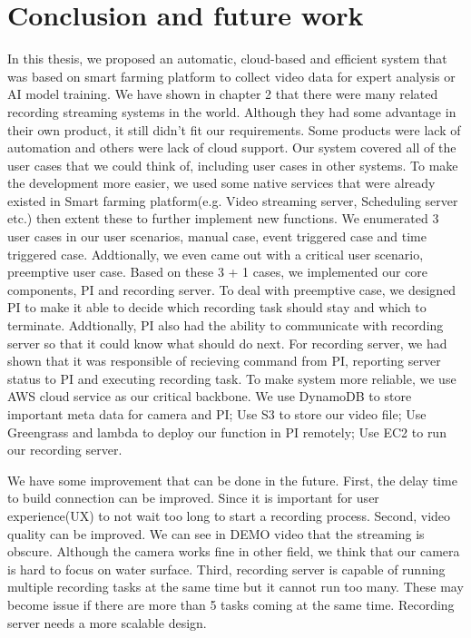 \chapter{Conclusion and future work}
\label{c:conclusion}





\graphicspath{{./figsrc/}}
\fi

In this thesis, we proposed an automatic, cloud-based and efficient system that was based on smart farming platform to collect video data for expert analysis or AI model training. We have shown in chapter 2 that there were many related recording streaming systems in the world. Although they had some advantage in their own product, it still didn't fit our requirements. Some products were lack of automation and others were lack of cloud support. Our system covered all of the user cases that we could think of, including user cases in other systems. To make the development more easier, we used some native services that were already existed in Smart farming platform(e.g. Video streaming server, Scheduling server etc.) then extent these to further implement new functions. We enumerated 3 user cases in our user scenarios, manual case, event triggered case and time triggered case. Addtionally, we even came out with a critical user scenario, preemptive user case. Based on these 3 + 1 cases, we implemented our core components, PI and recording server. To deal with preemptive case, we designed PI to make it able to decide which recording task should stay and which to terminate. Addtionally, PI also had the ability to communicate with recording server so that it could know what should do next. For recording server, we had shown that it was responsible of recieving command from PI, reporting server status to PI and executing recording task. To make system more reliable, we use AWS cloud service as our critical backbone. We use DynamoDB to store important meta data for camera and PI; Use S3 to store our video file; Use Greengrass and lambda to deploy our function in PI remotely; Use EC2 to run our recording server.

We have some improvement that can be done in the future. First, the delay time to build connection can be improved. Since it is important for user experience(UX) to not wait too long to start a recording process. Second, video quality can be improved. We can see in DEMO video that the streaming is obscure. Although the camera works fine in other field, we think that our camera is hard to focus on water surface. Third, recording server is capable of running multiple recording tasks at the same time but it cannot run too many. These may become issue if there are more than 5 tasks coming at the same time. Recording server needs a more scalable design.

